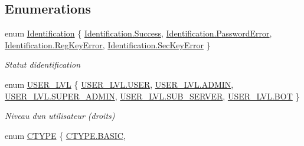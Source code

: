 \subsection*{Enumerations}
\begin{DoxyCompactItemize}
\item 
enum \mbox{\hyperlink{namespace_n_t_k_aa439a107aef6a5399750b755a88ccf07}{Identification}} \{ \mbox{\hyperlink{namespace_n_t_k_aa439a107aef6a5399750b755a88ccf07a505a83f220c02df2f85c3810cd9ceb38}{Identification.\+Success}}, 
\mbox{\hyperlink{namespace_n_t_k_aa439a107aef6a5399750b755a88ccf07afd5c4d7206b0f91963ab4336f642feff}{Identification.\+Password\+Error}}, 
\mbox{\hyperlink{namespace_n_t_k_aa439a107aef6a5399750b755a88ccf07ae04ccd65838fede4677eaa35834743f1}{Identification.\+Reg\+Key\+Error}}, 
\mbox{\hyperlink{namespace_n_t_k_aa439a107aef6a5399750b755a88ccf07a91ed273c6d0a7d27a05539cbbd15941a}{Identification.\+Sec\+Key\+Error}}
 \}
\begin{DoxyCompactList}\small\item\em Statut d\textquotesingle{}identification \end{DoxyCompactList}\item 
enum \mbox{\hyperlink{namespace_n_t_k_a1a2136a0cde3a719c9188a4d515e9f1b}{U\+S\+E\+R\+\_\+\+L\+VL}} \{ \newline
\mbox{\hyperlink{namespace_n_t_k_a1a2136a0cde3a719c9188a4d515e9f1ba2e40ad879e955201df4dedbf8d479a12}{U\+S\+E\+R\+\_\+\+L\+V\+L.\+U\+S\+ER}}, 
\mbox{\hyperlink{namespace_n_t_k_a1a2136a0cde3a719c9188a4d515e9f1ba73acd9a5972130b75066c82595a1fae3}{U\+S\+E\+R\+\_\+\+L\+V\+L.\+A\+D\+M\+IN}}, 
\mbox{\hyperlink{namespace_n_t_k_a1a2136a0cde3a719c9188a4d515e9f1bafb10f0238035c2b31076223dc45beea0}{U\+S\+E\+R\+\_\+\+L\+V\+L.\+S\+U\+P\+E\+R\+\_\+\+A\+D\+M\+IN}}, 
\mbox{\hyperlink{namespace_n_t_k_a1a2136a0cde3a719c9188a4d515e9f1baa0f56440d83403df94e4bddfb4b043dd}{U\+S\+E\+R\+\_\+\+L\+V\+L.\+S\+U\+B\+\_\+\+S\+E\+R\+V\+ER}}, 
\newline
\mbox{\hyperlink{namespace_n_t_k_a1a2136a0cde3a719c9188a4d515e9f1bab24436a7bab0fa6dc89ad0684c6fc675}{U\+S\+E\+R\+\_\+\+L\+V\+L.\+B\+OT}}
 \}
\begin{DoxyCompactList}\small\item\em Niveau d\textquotesingle{}un utilisateur (droits) \end{DoxyCompactList}\item 
enum \mbox{\hyperlink{namespace_n_t_k_a8fa28c7c4270bbb81ee96b4f632fdbec}{C\+T\+Y\+PE}} \{ \newline
\mbox{\hyperlink{namespace_n_t_k_a8fa28c7c4270bbb81ee96b4f632fdbecae4ac03f6c9f00665644e868dd1fb9f1e}{C\+T\+Y\+P\+E.\+B\+A\+S\+IC}}, 

\end{DoxyCompactItemize}
